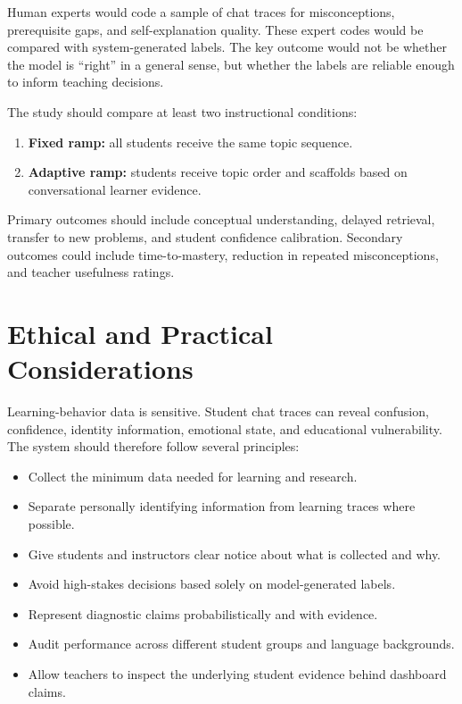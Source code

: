 \documentclass[11pt]{article}
\begin{document}
Human experts would code a sample of chat traces for misconceptions, prerequisite gaps, and self-explanation quality. These expert codes would be compared with system-generated labels. The key outcome would not be whether the model is ``right'' in a general sense, but whether the labels are reliable enough to inform teaching decisions.

The study should compare at least two instructional conditions:

\begin{enumerate}[leftmargin=*]
  \item \textbf{Fixed ramp:} all students receive the same topic sequence.
  \item \textbf{Adaptive ramp:} students receive topic order and scaffolds based on conversational learner evidence.
\end{enumerate}

Primary outcomes should include conceptual understanding, delayed retrieval, transfer to new problems, and student confidence calibration. Secondary outcomes could include time-to-mastery, reduction in repeated misconceptions, and teacher usefulness ratings.

\section{Ethical and Practical Considerations}

Learning-behavior data is sensitive. Student chat traces can reveal confusion, confidence, identity information, emotional state, and educational vulnerability. The system should therefore follow several principles:

\begin{itemize}[leftmargin=*]
  \item Collect the minimum data needed for learning and research.
  \item Separate personally identifying information from learning traces where possible.
  \item Give students and instructors clear notice about what is collected and why.
  \item Avoid high-stakes decisions based solely on model-generated labels.
  \item Represent diagnostic claims probabilistically and with evidence.
  \item Audit performance across different student groups and language backgrounds.
  \item Allow teachers to inspect the underlying student evidence behind dashboard claims.
\end{itemize}
\end{document}
